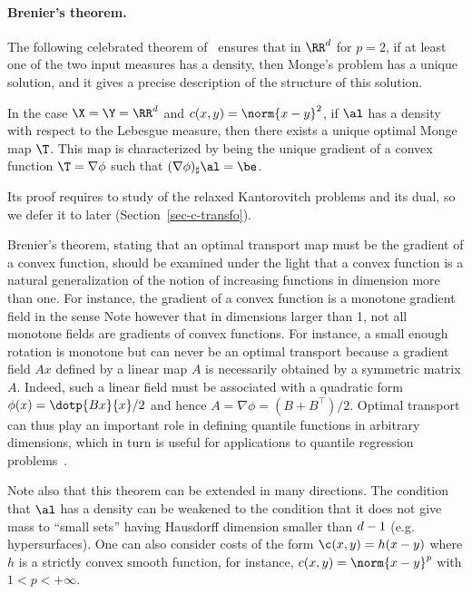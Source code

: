 \paragraph{Brenier's theorem.}

The following celebrated theorem of~\cite{Brenier91} ensures that in $\RR^\dims$ for $p=2$, if at least one of the two input measures has a density, then Monge's problem has a unique solution, and it gives a precise description of the structure of this solution.

\begin{thm}[Brenier]\label{thm-brenier}
	In the case $\X=\Y=\RR^\dims$ and $c(x,y)=\norm{x-y}^2$, if $\al$ has a density with respect to the Lebesgue measure, then there exists a unique optimal Monge map $\T$. This map is characterized by being the unique gradient of a convex function $\T=\nabla \phi$ such that $(\nabla \phi)_\sharp \al = \be$. 
\end{thm}

Its proof requires to study of the relaxed Kantorovitch problems and its dual, so we defer it to later (Section~\ref{sec-c-transfo}). 

Brenier's theorem, stating that an optimal transport map must be the gradient of a convex function, should be examined under the light that a convex function is a natural generalization of the notion of increasing functions in dimension more than one. 
%
For instance, the gradient of a convex function is a monotone gradient field in the sense
Note however that in dimensions larger than 1, not all monotone fields are gradients of convex functions. For instance, a small enough rotation is monotone but can never be an optimal transport because a gradient field $Ax$ defined by a linear map $A$ is necessarily obtained by a symmetric matrix $A$. Indeed, such a linear field must be associated with a quadratic form $\phi(x)=\dotp{Bx}{x}/2$
and hence $A=\nabla \phi = (B+B^\top)/2$.
%
Optimal transport can thus play an important role in defining quantile functions in arbitrary dimensions, which in turn is useful for applications to quantile regression problems~\cite{carlier2016vector}.
 
Note also that this theorem can be extended in many directions.  
% 
The condition that $\al$ has a density can be weakened to the condition that it does not give mass to ``small sets'' having Hausdorff dimension smaller than $d-1$ (e.g. hypersurfaces). 
%
One can also consider costs of the form $\c(x,y)=h(x-y)$ where $h$ is a strictly convex smooth function, for instance, $c(x,y)=\norm{x-y}^p$ with $1<p<+\infty$. 

